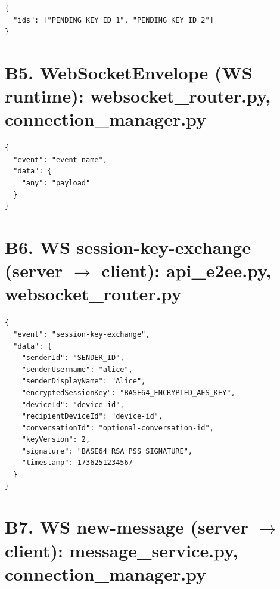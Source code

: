 \begin{verbatim}
{
  "ids": ["PENDING_KEY_ID_1", "PENDING_KEY_ID_2"]
}
\end{verbatim}

\section*{B5. WebSocketEnvelope (WS runtime): websocket\-\_router.py, connection\-\_manager.py}

\begin{verbatim}
{
  "event": "event-name",
  "data": {
    "any": "payload"
  }
}
\end{verbatim}

\section*{B6. WS session-key-exchange (server $\to$ client): api\-\_e2ee.py, websocket\-\_router.py}

\begin{verbatim}
{
  "event": "session-key-exchange",
  "data": {
    "senderId": "SENDER_ID",
    "senderUsername": "alice",
    "senderDisplayName": "Alice",
    "encryptedSessionKey": "BASE64_ENCRYPTED_AES_KEY",
    "deviceId": "device-id",
    "recipientDeviceId": "device-id",
    "conversationId": "optional-conversation-id",
    "keyVersion": 2,
    "signature": "BASE64_RSA_PSS_SIGNATURE",
    "timestamp": 1736251234567
  }
}
\end{verbatim}

\section*{B7. WS new-message (server $\to$ client): message\-\_service.py, connection\-\_manager.py}


